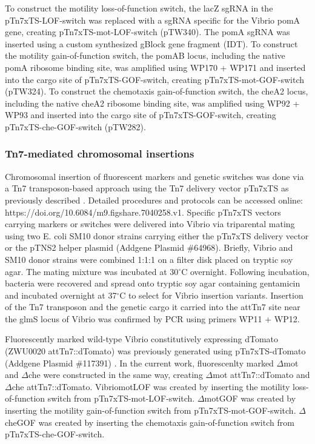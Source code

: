 To construct the motility loss-of-function switch, the lacZ sgRNA in the pTn7xTS-LOF-switch was replaced with a sgRNA specific for the Vibrio pomA gene, creating pTn7xTS-mot-LOF-switch (pTW340). The pomA sgRNA was inserted using a custom synthesized gBlock gene fragment (IDT). To construct the motility gain-of-function switch, the pomAB locus, including the native pomA ribosome binding site, was amplified using WP170 + WP171 and inserted into the cargo site of pTn7xTS-GOF-switch, creating pTn7xTS-mot-GOF-switch (pTW324). To construct the chemotaxis gain-of-function switch, the cheA2 locus, including the native cheA2 ribosome binding site, was amplified using WP92 + WP93 and inserted into the cargo site of pTn7xTS-GOF-switch, creating pTn7xTS-che-GOF-switch (pTW282).

\subsubsection{Tn7-mediated chromosomal insertions}
Chromosomal insertion of fluorescent markers and genetic switches was done via a Tn7 transposon-based approach using the Tn7 delivery vector pTn7xTS as previously described \cite{wiles_modernized_2018}. Detailed procedures and protocols can be accessed online: https://doi.org/10.6084/m9.figshare.7040258.v1. Specific pTn7xTS vectors carrying markers or switches were delivered into Vibrio via triparental mating using two E. coli SM10 donor strains carrying either the pTn7xTS delivery vector or the pTNS2 helper plasmid (Addgene Plasmid \#64968). Briefly, Vibrio and SM10 donor strains were combined 1:1:1 on a filter disk placed on tryptic soy agar. The mating mixture was incubated at 30$^\circ$C overnight. Following incubation, bacteria were recovered and spread onto tryptic soy agar containing gentamicin and incubated overnight at 37$^\circ$C to select for Vibrio insertion variants. Insertion of the Tn7 transposon and the genetic cargo it carried into the attTn7 site near the glmS locus of Vibrio was confirmed by PCR using primers WP11 + WP12.

Fluorescently marked wild-type Vibrio constitutively expressing dTomato (ZWU0020 attTn7::dTomato) was previously generated using pTn7xTS-dTomato (Addgene Plasmid \#117391) \cite{wiles_modernized_2018}. In the current work, fluorescenlty marked $\Delta$mot and $\Delta$che were constructed in the same way, creating $\Delta$mot attTn7::dTomato  and $\Delta$che attTn7::dTomato. VibriomotLOF was created by inserting the motility loss-of-function switch from pTn7xTS-mot-LOF-switch. $\Delta$motGOF was created by inserting the motility gain-of-function switch from pTn7xTS-mot-GOF-switch. $\Delta$cheGOF was created by inserting the chemotaxis gain-of-function switch from pTn7xTS-che-GOF-switch.

